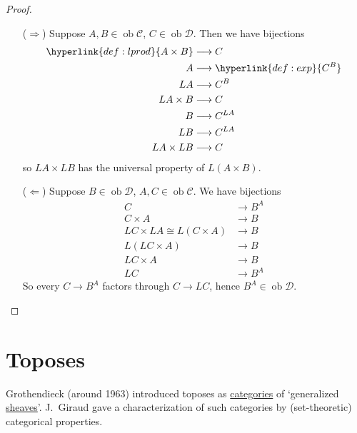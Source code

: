 \documentclass{article}
\DeclareMathOperator{\ob}{ob}
\let\to\longrightarrow
\begin{document}
\begin{proof}\leavevmode
  \begin{itemize}
    \item[($\Rightarrow$)] Suppose $A,B \in \ob \mathscr{C}$, $C \in \ob \mathscr{D}$.
      Then we have bijections
      \begin{align*}
        \hyperlink{def:lprod}{A \times B} &\to C  \\
        A &\to \hyperlink{def:exp}{C^B} \\
        LA &\to C^B \\
        LA \times B &\to C \\
        B &\to C^{LA} \\
        LB &\to C^{LA} \\
        LA \times LB &\to C
      \end{align*}
      so $LA \times LB$ has the universal property of $L(A \times B)$.
    \item [($\Leftarrow$)] Suppose $B \in \ob \mathscr{D}$, $A,C \in \ob \mathscr{C}$. We have bijections
      \begin{align*}
        C &\to B^A \\
        C \times A &\to B \\
        LC \times LA \cong L(C \times A) &\to B \\
        L(LC \times A) &\to B \\
        LC \times A &\to B \\
        LC &\to B^A
      \end{align*}
      So every $C \to B^A$ factors through $C \to LC$, hence $B^A \in \ob \mathscr{D}$. \qedhere
  \end{itemize}
\end{proof}

\clearpage
\section{Toposes}
Grothendieck (around 1963) introduced toposes as \hyperlink{def:cat}{categories} of `generalized \hyperlink{def:presheaf}{sheaves}'.
J.\ Giraud gave a characterization of such categories by (set-theoretic) categorical properties.
\end{document}
